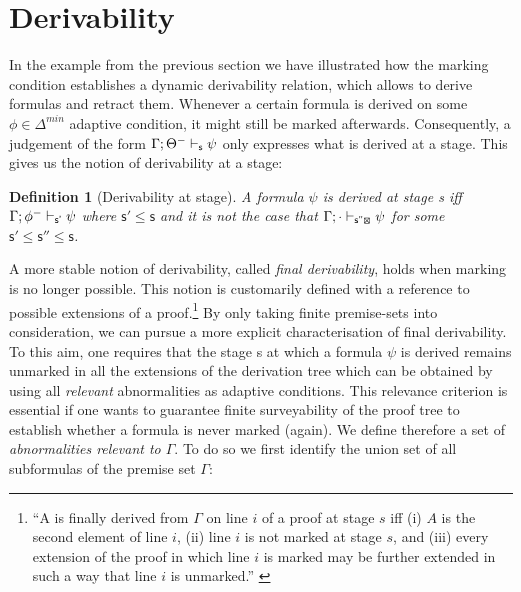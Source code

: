 \documentclass[]{article}
\newtheorem{definition}{Definition}
\newcommand{\Turn}[2]
    { {#1}\vdash_{\textbf{\sf s}}  {#2}}
\newcommand{\TurnPrime}[2]
    { {#1}\vdash_{\textbf{\sf s'}}  {#2}}
\newcommand{\TurnMarked}[2]
    { {#1}\vdash_{\textbf{\sf s\XBox}}  {#2}}
\newcommand{\TurnPrimePrimeMarked}[2]
        { {#1}\vdash_{\textbf{\sf s''\XBox}}  {#2}}
\begin{document}
\section{Derivability}\label{sec:meta}

In the example from the previous section we have illustrated how the marking condition establishes a dynamic derivability relation, which allows to derive formulas and retract them. Whenever a certain formula is derived on some $\phi\in \Delta^{min}$ adaptive condition, it might still be marked afterwards. Consequently, a judgement of the form $\Turn{\Gamma; \Theta^-}{\psi}$ only expresses what is derived at a stage. This gives us the notion of derivability at a stage:

\begin{definition}[Derivability at stage]
A formula $\psi$ is derived at stage {\sf s}  iff $\TurnPrime{\Gamma; \phi^{-}}{\psi}$ where $\mathsf{s'\leq s}$ and it is not the case that $\TurnPrimePrimeMarked{\Gamma; \cdot}{\psi}$ for some $\mathsf{s'\leq s''\leq s}$.
\end{definition}

A more stable notion of derivability, called \emph{final derivability}, holds when marking is no longer possible. This notion is customarily defined with a reference to possible extensions of a proof.\footnote{``A is finally derived from $\Gamma$ on line $i$ of a proof at stage $s$ iff (i) $A$ is the second element of line $i$, (ii) line $i$ is not marked at stage $s$, and (iii) every extension of the proof in which line $i$ is marked may be further extended in such a way that line $i$ is unmarked.'' \cite[229]{batens07}} By only taking finite premise-sets into consideration, we can pursue a more explicit characterisation of final derivability.
%
%
To this aim, one requires that the stage {\sf s} at which a formula $\psi$ is derived remains unmarked in all the extensions of the derivation tree which can be obtained by using all \textit{relevant} abnormalities as adaptive conditions. This relevance criterion is essential if one wants to guarantee finite surveyability of the proof tree to establish whether a formula is never marked (again). We define therefore a set of \textit{abnormalities relevant to $\Gamma$}. To do so we first identify the union set of all subformulas of the premise set $\Gamma$:
\end{document}
